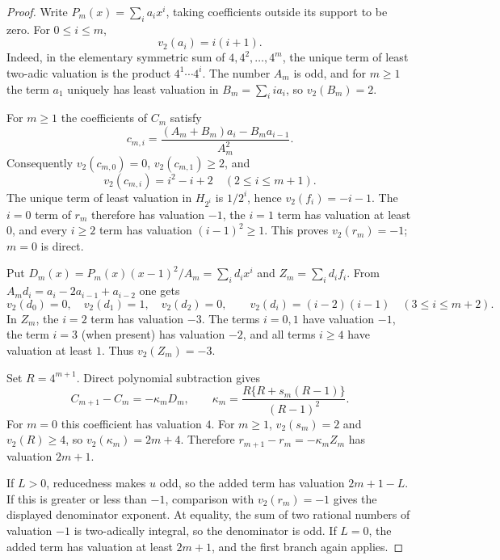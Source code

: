 \documentclass[11pt,a4paper]{article}
\theoremstyle{definition}
\theoremstyle{remark}
\begin{document}
\begin{proof}
Write $P_m(x)=\sum_i a_i x^i$, taking coefficients outside its support
to be zero. For $0\le i\le m$,
\[
 v_2(a_i)=i(i+1).
\]
Indeed, in the elementary symmetric sum of $4,4^2,\ldots,4^m$, the
unique term of least two-adic valuation is the product $4^1\cdots4^i$.
The number $A_m$ is odd, and for $m\ge1$ the term $a_1$ uniquely has
least valuation in $B_m=\sum_i i a_i$, so $v_2(B_m)=2$.

For $m\ge1$ the coefficients of $C_m$ satisfy
\[
 c_{m,i}=\frac{(A_m+B_m)a_i-B_ma_{i-1}}{A_m^2}.
\]
Consequently $v_2(c_{m,0})=0$, $v_2(c_{m,1})\ge2$, and
\[
 v_2(c_{m,i})=i^2-i+2\quad(2\le i\le m+1).
\]
The unique term of least valuation in $H_{2^i}$ is $1/2^i$, hence
$v_2(f_i)=-i-1$. The $i=0$ term of $r_m$ therefore has valuation $-1$,
the $i=1$ term has valuation at least $0$, and every $i\ge2$ term has
valuation $(i-1)^2\ge1$. This proves $v_2(r_m)=-1$; $m=0$ is direct.

Put $D_m(x)=P_m(x)(x-1)^2/A_m=\sum_i d_i x^i$ and
$Z_m=\sum_i d_i f_i$. From
$A_md_i=a_i-2a_{i-1}+a_{i-2}$ one gets
\[
 v_2(d_0)=0,\quad v_2(d_1)=1,\quad v_2(d_2)=0,
 \qquad v_2(d_i)=(i-2)(i-1)\quad(3\le i\le m+2).
\]
In $Z_m$, the $i=2$ term has valuation $-3$. The terms $i=0,1$ have
valuation $-1$, the term $i=3$ (when present) has valuation $-2$, and
all terms $i\ge4$ have valuation at least $1$. Thus $v_2(Z_m)=-3$.

Set $R=4^{m+1}$. Direct polynomial subtraction gives
\[
 C_{m+1}-C_m=-\kappa_mD_m,\qquad
 \kappa_m=\frac{R\{R+s_m(R-1)\}}{(R-1)^2}.
\]
For $m=0$ this coefficient has valuation $4$. For $m\ge1$,
$v_2(s_m)=2$ and $v_2(R)\ge4$, so $v_2(\kappa_m)=2m+4$.
Therefore $r_{m+1}-r_m=-\kappa_mZ_m$ has valuation $2m+1$.

If $L>0$, reducedness makes $u$ odd, so the added term has valuation
$2m+1-L$. If this is greater or less than $-1$, comparison with
$v_2(r_m)=-1$ gives the displayed denominator exponent. At equality,
the sum of two rational numbers of valuation $-1$ is two-adically integral,
so the denominator is odd. If $L=0$, the added term has valuation at
least $2m+1$, and the first branch again applies.
\end{proof}
\end{document}
